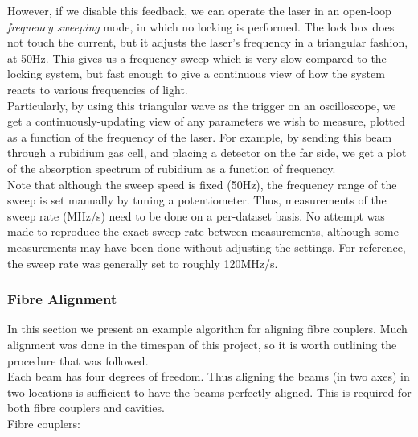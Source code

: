 However, if we disable this feedback, we can operate the laser in an open-loop \emph{frequency sweeping} mode, in which no locking is performed.  The lock box does not touch the current, but it adjusts the laser's frequency in a triangular fashion, at 50Hz.  This gives us a frequency sweep which is very slow compared to the locking system, but fast enough to give a continuous view of how the system reacts to various frequencies of light. \\

Particularly, by using this triangular wave as the trigger on an oscilloscope, we get a continuously-updating view of any parameters we wish to measure, plotted as a function of the frequency of the laser.  For example, by sending this beam through a rubidium gas cell, and placing a detector on the far side, we get a plot of the absorption spectrum of rubidium as a function of frequency. \\

Note that although the sweep speed is fixed (50Hz), the frequency range of the sweep is set manually by tuning a potentiometer.  Thus, measurements of the sweep rate (MHz/s) need to be done on a per-dataset basis.  No attempt was made to reproduce the exact sweep rate between measurements, although some measurements may have been done without adjusting the settings.  For reference, the sweep rate was generally set to roughly 120MHz/s. \\
    
    \subsubsection{Fibre Alignment}

In this section we present an example algorithm for aligning fibre couplers.  Much alignment was done in the timespan of this project, so it is worth outlining the procedure that was followed. \\

Each beam has four degrees of freedom.  Thus aligning the beams (in two axes) in two locations is sufficient to have the beams perfectly aligned.  This is required for both fibre couplers and cavities. \\

Fibre couplers:

